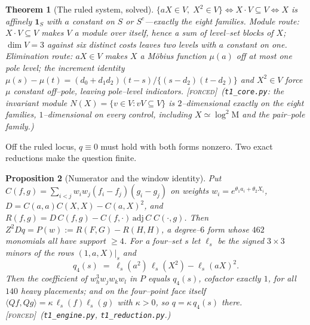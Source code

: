 \documentclass[11pt]{article}
\newtheorem{theorem}{Theorem}[section]
\newtheorem{proposition}[theorem]{Proposition}
\theoremstyle{definition}
\newcommand{\Mah}{\mathrm{M}}
\newcommand{\forcedtag}{{\scshape [forced]}}
\begin{document}
\begin{theorem}[The ruled system, solved]\label{thm:ruled}
$\{aX\in V,\;X^2\in V\}\iff X\!\cdot\!V\subseteq V\iff X$ is affinely $\mathbf 1_S$ with $a$ constant
on $S$ or $S^c$---exactly the eight families. Module route: $X\!\cdot\!V\subseteq V$ makes $V$ a module
over itself, hence a sum of level--set blocks of $X$; $\dim V=3$ against six distinct costs leaves
two levels with $a$ constant on one. Elimination route: $aX\in V$ makes $X$ a M\"obius function
$\mu(a)$ off at most one pole level; the increment identity
$\mu(s)-\mu(t)=(d_0+d_1d_2)(t-s)/\{(s-d_2)(t-d_2)\}$ and $X^2\in V$ force $\mu$ constant off--pole,
leaving pole--level indicators. \forcedtag\ (\texttt{t1\_core.py}: the invariant module
$N(X)=\{v\in V:vV\subseteq V\}$ is $2$--dimensional exactly on the eight families, $1$--dimensional on
every control, including $X\simeq\log^2\Mah$ and the pair--pole family.)
\end{theorem}

Off the ruled locus, $q\equiv0$ must hold with both forms nonzero. Two exact reductions make the
question finite.

\begin{proposition}[Numerator and the window identity]\label{prop:window}
Put $C(f,g)=\sum_{i<j}w_iw_j(f_i-f_j)(g_i-g_j)$ on weights $w_i=e^{\theta_1a_i+\theta_2X_i}$,
$D=C(a,a)C(X,X)-C(a,X)^2$, and $R(f,g)=D\,C(f,g)-C(f,\cdot)\,\mathrm{adj}\,C\;C(\cdot,g)$. Then
$Z^2Dq=P(w):=R(F,G)-R(H,H)$, a degree--$6$ form whose $462$ monomials all have support $\ge4$. For a
four--set $s$ let $\ell_s$ be the signed $3\times3$ minors of the rows $(1,a,X)|_s$ and
\[
q_4(s)\;=\;\ell_s(a^2)\,\ell_s(X^2)-\ell_s(aX)^2 .
\]
Then the coefficient of $w_h^3w_jw_kw_l$ in $P$ \emph{equals} $q_4(s)$, cofactor exactly $1$, for all
$140$ heavy placements; and on the four--point face itself $\langle Qf,Qg\rangle=\kappa\,
\ell_s(f)\ell_s(g)$ with $\kappa>0$, so $q=\kappa\,q_4(s)$ there. \forcedtag\
(\texttt{t1\_engine.py}, \texttt{t1\_reduction.py}.)
\end{proposition}
\end{document}
